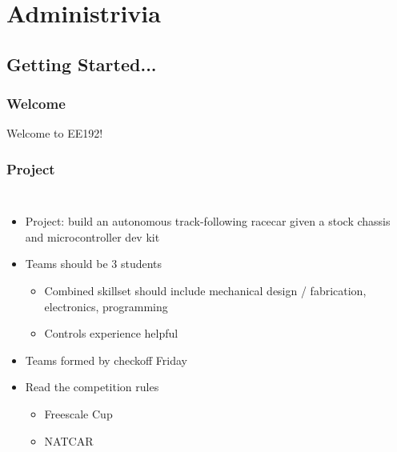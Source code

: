 \documentclass{beamer}
\begin{document}
\begin{frame}
\titlepage

\setcounter{tocdepth}{1}
\tableofcontents
\end{frame}


\section{Administrivia} %
\subsection{Getting Started...}

\begin{frame}
\frametitle{Welcome}
\begin{center}
{\huge Welcome to EE192!}
\end{center}
\end{frame}

\begin{frame}
\frametitle{Project}
\begin{columns}[t]
\begin{itemize}
  \item Project: build an autonomous track-following racecar given a stock chassis and microcontroller dev kit
  \item Teams should be 3 students
  \begin{itemize}
    \item Combined skillset should include mechanical design / fabrication, electronics, programming
    \item Controls experience helpful
  \end{itemize}
  \item Teams formed by checkoff Friday
  \item Read the competition rules
  \begin{itemize}
    \item Freescale Cup
    \item NATCAR
  \end{itemize}
\end{itemize}

\end{columns}
\end{frame}
\end{document}
